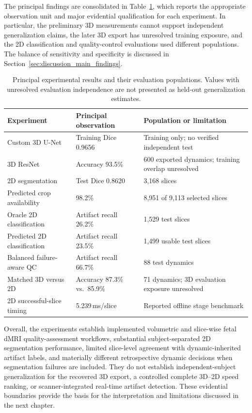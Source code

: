 The principal findings are consolidated in Table~\ref{tab:results_summary_overview}, which reports the appropriate observation unit and major evidential qualification for each experiment. In particular, the preliminary 3D measurements cannot support independent generalization claims, the later 3D export has unresolved training exposure, and the 2D classification and quality-control evaluations used different populations. The balance of sensitivity and specificity is discussed in Section~\ref{sec:discussion_main_findings}.

\begin{table}[htbp]
\centering
\caption{Principal experimental results and their evaluation populations. Values with unresolved evaluation independence are not presented as held-out generalization estimates.}
\label{tab:results_summary_overview}
\begin{tabular}{p{}p{}p{}}
\hline
Experiment & Principal observation & Population or limitation \\
\hline
Custom 3D U-Net & Training Dice 0.9656 & Training only; no verified independent test \\
3D ResNet & Accuracy 93.5\% & 600 exported dynamics; training overlap unresolved \\
2D segmentation & Test Dice 0.8620 & 3,168 slices \\
Predicted crop availability & 98.2\% & 8,951 of 9,113 selected slices \\
Oracle 2D classification & Artifact recall 26.2\% & 1,529 test slices \\
Predicted 2D classification & Artifact recall 23.5\% & 1,499 usable test slices \\
Balanced failure-aware QC & Artifact recall 66.7\% & 88 test dynamics \\
Matched 3D versus 2D & Accuracy 87.3\% vs.\ 85.9\% & 71 dynamics; 3D evaluation exposure unresolved \\
2D successful-slice timing & 5.239\,ms/slice & Reported offline stage benchmark \\
\hline
\end{tabular}
\end{table}

Overall, the experiments establish implemented volumetric and slice-wise fetal dMRI quality-assessment workflows, substantial subject-separated 2D segmentation performance, limited slice-level agreement with dynamic-inherited artifact labels, and materially different retrospective dynamic decisions when segmentation failures are included. They do not establish independent-subject generalization for the recovered 3D export, a controlled complete 3D--2D speed ranking, or scanner-integrated real-time artifact detection. These evidential boundaries provide the basis for the interpretation and limitations discussed in the next chapter.
